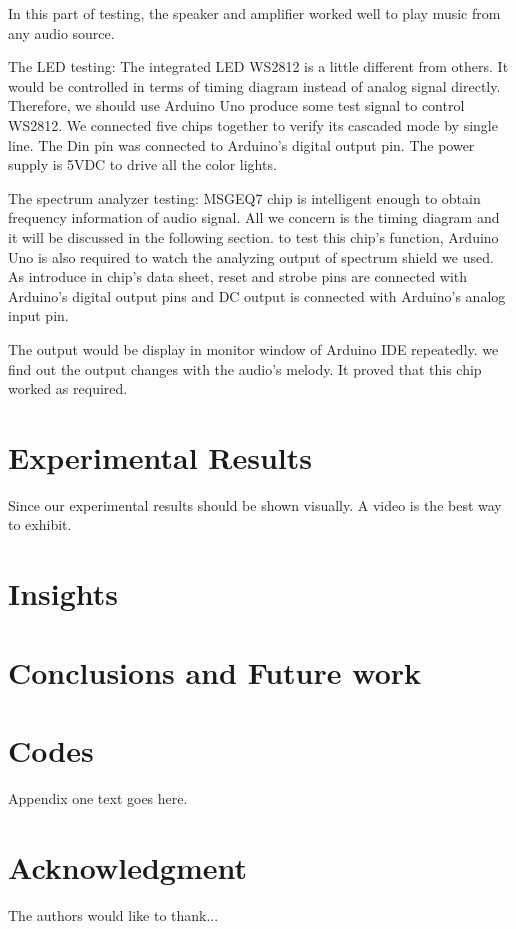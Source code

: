 \documentclass[12pt,a4paper,conference]{IEEEtran}
\begin{document}
In this part of testing, the speaker and amplifier worked well to play music from any audio source.

The LED testing: The integrated LED WS2812 is a little different from others. It would be controlled in terms of timing diagram instead of analog signal directly. Therefore, we should use Arduino Uno produce some test signal to control WS2812. We connected five chips together to verify its cascaded mode by single line. The Din pin was connected to Arduino's digital output pin. The power supply is 5VDC to drive all the color lights.

The spectrum analyzer testing: MSGEQ7 chip is intelligent enough to obtain frequency information of audio signal. All we concern is the timing diagram and it will be discussed in the following section. to test this chip's function, Arduino Uno is also required to watch the analyzing output of spectrum shield we used. As introduce in chip's data sheet, reset and strobe pins are connected with Arduino's digital output pins and DC output is connected with Arduino's analog input pin.

The output would be display in monitor window of Arduino IDE repeatedly. we find out the output changes with the audio's melody. It proved that this chip worked as required. 

\section{Experimental Results}

Since our experimental results should be shown visually. A video is the best way to exhibit.  

\section{Insights}

\section{Conclusions and Future work}

\appendices
\section{Codes}
Appendix one text goes here.

\section*{Acknowledgment}


The authors would like to thank...


\ifCLASSOPTIONcaptionsoff
  \newpage
\fi

\end{document}
